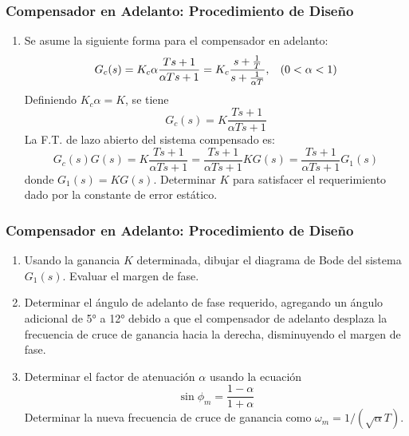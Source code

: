\documentclass[aspectratio=169]{beamer}
\theoremstyle{definition}
\theoremstyle{plain}
\theoremstyle{remark}
\newcounter{saveenumi}
\newcommand{\seti}{\setcounter{saveenumi}{\value{enumi}}}
\newcommand{\conti}{\setcounter{enumi}{\value{saveenumi}}}
\begin{document}
\begin{frame}[<+->]\frametitle{Compensador en Adelanto: Procedimiento de Diseño}
	\begin{enumerate}
		\item Se asume la siguiente forma para el compensador en adelanto:
		\begin{equation*}
			G_c(s) = K_c \alpha \frac{Ts+1}{\alpha Ts+1} = K_c \frac{s+\frac{1}{T}}{s+\frac{1}{\alpha T}}, \hspace*{3mm} (0 < \alpha < 1)
		\end{equation*}
		\pause
		Definiendo $K_c \alpha = K$, se tiene
		\begin{equation*}
			G_c(s) = K \frac{Ts+1}{\alpha Ts+1}
		\end{equation*}
		\pause
		La F.T. de lazo abierto del sistema compensado es:
		\begin{equation*}
			G_c(s)G(s) = K \frac{Ts+1}{\alpha Ts+1} = \frac{Ts+1}{\alpha Ts+1} KG(s) = \frac{Ts+1}{\alpha Ts+1} G_1(s)
		\end{equation*}
		donde $G_1(s) = KG(s)$.
		\pause
		Determinar $K$ para satisfacer el requerimiento dado por la constante de error estático.
		\seti
	\end{enumerate}
\end{frame}

\begin{frame}[<+->]\frametitle{Compensador en Adelanto: Procedimiento de Diseño}
	\begin{enumerate}
		\conti
		\item Usando la ganancia $K$ determinada, dibujar el diagrama de Bode del sistema $G_1(s)$. Evaluar el margen de fase.
		\item Determinar el ángulo de adelanto de fase requerido, agregando un ángulo adicional de \ang{5} a \ang{12} debido a que el compensador de adelanto desplaza la frecuencia de cruce de ganancia hacia la derecha, disminuyendo el margen de fase.
		\item Determinar el factor de atenuación $\alpha$ usando la ecuación
		\begin{equation*}
			\sin \phi_m = \frac{1-\alpha}{1+\alpha}
		\end{equation*}
		Determinar la nueva frecuencia de cruce de ganancia como $\omega_m = 1/(\sqrt{\alpha}T)$.
		\seti
	\end{enumerate}
\end{frame}
\end{document}
